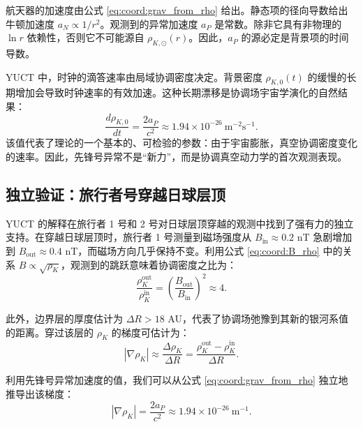 \documentclass[11pt,a4paper]{article}
\theoremstyle{remark}
\begin{document}
	航天器的加速度由公式 \eqref{eq:coord:grav_from_rho} 给出。静态项的径向导数给出牛顿加速度 \(a_N \propto 1/r^2\)。观测到的异常加速度 \(a_P\) 是常数。除非它具有非物理的 \(\ln r\) 依赖性，否则它不可能源自 \(\rho_{K,\odot}(r)\)。因此，\(a_P\) 的源必定是背景项的时间导数。
	
	YUCT 中，时钟的滴答速率由局域协调密度决定。背景密度 \(\rho_{K,0}(t)\) 的缓慢的长期增加会导致时钟速率的有效加速。这种长期漂移是协调场宇宙学演化的自然结果：
	\begin{equation}
		\frac{d\rho_{K,0}}{dt} = \frac{2a_P}{c^2} \approx 1.94 \times 10^{-26}\ \text{m}^{-2}\text{s}^{-1}.
		\label{eq:coord:rho_dot}
	\end{equation}
	该值代表了理论的一个基本的、可检验的参数：由于宇宙膨胀，真空协调密度变化的速率。因此，先锋号异常不是“新力”，而是协调真空动力学的首次观测表现。
	
	\subsection{独立验证：旅行者号穿越日球层顶}
	\label{subsec:coord:voyager}
	
	YUCT 的解释在旅行者 1 号和 2 号对日球层顶穿越的观测中找到了强有力的独立支持。在穿越日球层顶时，旅行者 1 号测量到磁场强度从 \(B_{\text{in}} \approx 0.2\) nT 急剧增加到 \(B_{\text{out}} \approx 0.4\) nT，而磁场方向几乎保持不变。利用公式 \eqref{eq:coord:B_rho} 中的关系 \(B \propto \sqrt{\rho_K}\)，观测到的跳跃意味着协调密度之比为：
	\begin{equation}
		\frac{\rho_K^{\text{out}}}{\rho_K^{\text{in}}} = \left( \frac{B_{\text{out}}}{B_{\text{in}}} \right)^2 \approx 4.
		\label{eq:coord:rho_ratio_voyager}
	\end{equation}
	
	此外，边界层的厚度估计为 \(\Delta R > 18\) AU，代表了协调场弛豫到其新的银河系值的距离。穿过该层的 \(\rho_K\) 的梯度可估计为：
	\begin{equation}
		|\nabla \rho_K| \approx \frac{\Delta \rho_K}{\Delta R} = \frac{\rho_K^{\text{out}} - \rho_K^{\text{in}}}{\Delta R}.
		\label{eq:coord:gradient_estimate}
	\end{equation}
	
	利用先锋号异常加速度的值，我们可以从公式 \eqref{eq:coord:grav_from_rho} 独立地推导出该梯度：
	\begin{equation}
		|\nabla \rho_K| = \frac{2a_P}{c^2} \approx 1.94 \times 10^{-26}\ \text{m}^{-1}.
		\label{eq:coord:gradient_pioneer}
	\end{equation}
	
\end{document}
